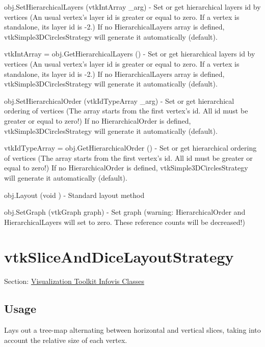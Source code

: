\begin{DoxyItemize}
\item {\ttfamily obj.\-Set\-Hierarchical\-Layers (vtk\-Int\-Array \-\_\-arg)} -\/ Set or get hierarchical layers id by vertices (An usual vertex's layer id is greater or equal to zero. If a vertex is standalone, its layer id is -\/2.) If no Hierarchical\-Layers array is defined, vtk\-Simple3\-D\-Circles\-Strategy will generate it automatically (default).  
\item {\ttfamily vtk\-Int\-Array = obj.\-Get\-Hierarchical\-Layers ()} -\/ Set or get hierarchical layers id by vertices (An usual vertex's layer id is greater or equal to zero. If a vertex is standalone, its layer id is -\/2.) If no Hierarchical\-Layers array is defined, vtk\-Simple3\-D\-Circles\-Strategy will generate it automatically (default).  
\item {\ttfamily obj.\-Set\-Hierarchical\-Order (vtk\-Id\-Type\-Array \-\_\-arg)} -\/ Set or get hierarchical ordering of vertices (The array starts from the first vertex's id. All id must be greater or equal to zero!) If no Hierarchical\-Order is defined, vtk\-Simple3\-D\-Circles\-Strategy will generate it automatically (default).  
\item {\ttfamily vtk\-Id\-Type\-Array = obj.\-Get\-Hierarchical\-Order ()} -\/ Set or get hierarchical ordering of vertices (The array starts from the first vertex's id. All id must be greater or equal to zero!) If no Hierarchical\-Order is defined, vtk\-Simple3\-D\-Circles\-Strategy will generate it automatically (default).  
\item {\ttfamily obj.\-Layout (void )} -\/ Standard layout method  
\item {\ttfamily obj.\-Set\-Graph (vtk\-Graph graph)} -\/ Set graph (warning\-: Hierarchical\-Order and Hierarchical\-Layers will set to zero. These reference counts will be decreased!)  
\end{DoxyItemize}\hypertarget{vtkinfovis_vtksliceanddicelayoutstrategy}{}\section{vtk\-Slice\-And\-Dice\-Layout\-Strategy}\label{vtkinfovis_vtksliceanddicelayoutstrategy}
Section\-: \hyperlink{sec_vtkinfovis}{Visualization Toolkit Infovis Classes} \hypertarget{vtkwidgets_vtkxyplotwidget_Usage}{}\subsection{Usage}\label{vtkwidgets_vtkxyplotwidget_Usage}
Lays out a tree-\/map alternating between horizontal and vertical slices, taking into account the relative size of each vertex.

